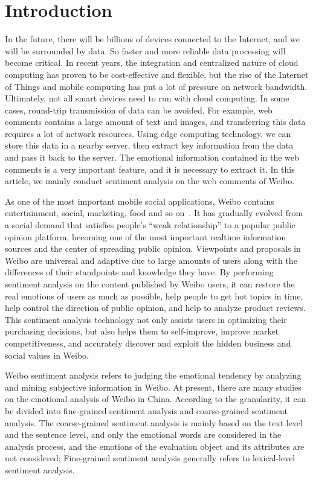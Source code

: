 \documentclass[runningheads, twocolumn]{llncs}
\begin{document}
\section{Introduction}
In the future, there will be billions of devices connected to the Internet, and we will be surrounded by data. So faster and more reliable data processing will become critical. In recent years, the integration and centralized nature of cloud computing has proven to be cost-effective and flexible, but the rise of the Internet of Things and mobile computing has put a lot of pressure on network bandwidth. Ultimately, not all smart devices need to run with cloud computing. In some cases, round-trip transmission of data can be avoided. For example, web comments contains a large amount of text and images, and transferring this data requires a lot of network resources. Using edge computing technology, we can store this data in a nearby server, then extract key information from the data and pass it back to the server. The emotional information contained in the web comments is a very important feature, and it is necessary to extract it. In this article, we mainly conduct sentiment analysis on the web comments of Weibo.

As one of the most important mobile social applications, Weibo contains entertainment, social, marketing, food and so on~\cite{DBLP:conf/IEEEcit/ChenLZW16}. It has gradually evolved from a social demand that satisfies people’s “weak relationship” to a popular public opinion platform, becoming one of the most important realtime information sources and the center of spreading public opinion. Viewpoints and proposals in Weibo are universal and adaptive due to large amounts of users along with the differences of their standpoints and knowledge they have. By performing sentiment analysis on the content published by Weibo users, it can restore the real emotions of users as much as possible, help people to get hot topics in time, help control the direction of public opinion, and help to analyze product reviews. This sentiment analysis technology not only assists users in optimizing their purchasing decisions, but also helps them to self-improve, improve market competitiveness, and accurately discover and exploit the hidden business and social values in Weibo.

Weibo sentiment analysis refers to judging the emotional tendency by analyzing and mining subjective information in Weibo. At present, there are many studies on the emotional analysis of Weibo in China. According to the granularity, it can be divided into fine-grained sentiment analysis and coarse-grained sentiment analysis. The coarse-grained sentiment analysis is mainly based on the text level and the sentence level, and only the emotional words are considered in the analysis process, and the emotions of the evaluation object and its attributes are not considered; Fine-grained sentiment analysis generally refers to lexical-level sentiment analysis.
\end{document}
